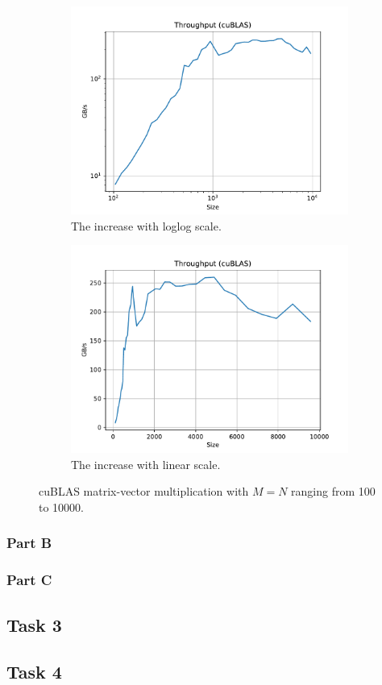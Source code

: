 \documentclass[9pt]{article}
\begin{document}
\begin{figure}[!ht]
    \centering
    \begin{subfigure}[b]{0.49\textwidth}
        \centering
        \includegraphics[width=\linewidth]{figs/cublas_loglog.pdf}
        \caption{The increase with loglog scale.}
        \label{fig:cublas_loglog}
    \end{subfigure}\hfill
    \begin{subfigure}[b]{0.49\textwidth}
        \centering
        \includegraphics[width=\linewidth]{figs/cublas_linear.pdf}
	\caption{The increase with linear scale.}
	\label{fig:cublas_linear}
    \end{subfigure}\hfill
    \caption{cuBLAS matrix-vector multiplication with $M=N$ ranging from 100 to 10000.}
    \label{fig:mv_cublas_mult}
\end{figure}
\subsubsection{Part B}

\subsubsection{Part C}
\subsection{Task 3}
\subsection{Task 4}
\end{document}
